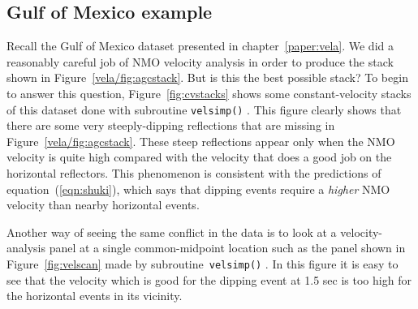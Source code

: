 \subsection{Gulf of Mexico example}
\par
Recall the Gulf of Mexico dataset presented in chapter~\ref{paper:vela}.
We did a reasonably careful job of NMO velocity analysis
in order to produce the stack shown in Figure~\ref{vela/fig:agcstack}.
But is this the best possible stack?
To begin to answer this question, Figure~\ref{fig:cvstacks} shows
some constant-velocity stacks of this dataset done with subroutine
\texttt{velsimp()} .
This figure clearly shows that
there are some very steeply-dipping reflections
that are missing in Figure~\ref{vela/fig:agcstack}.
These steep reflections appear only when the NMO velocity
is quite high compared with the velocity
that does a good job on the horizontal reflectors.
This phenomenon is consistent with 
the predictions of equation~(\ref{eqn:shuki}),
which says that dipping events 
require a {\em higher} NMO velocity than nearby horizontal events.
%
\par
Another way of seeing the same conflict in the data
is to look at a velocity-analysis panel
at a single common-midpoint location
such as the panel shown in Figure~\ref{fig:velscan}
made by subroutine~\texttt{velsimp()} .
In this figure it is easy to see that the velocity
which is good for the dipping event at 1.5 sec is too high
for the horizontal events in its vicinity.
%

